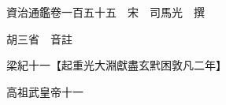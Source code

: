 










 


 
 


 

  
  
  
  
  





  
  
  
  
  
 
  

  

  
  
  



  

 
 

  
   




  

  
  


  　　資治通鑑卷一百五十五　宋　司馬光　撰

　　胡三省　音註

　　梁紀十一【起重光大淵獻盡玄黓困敦凡二年】

　　高祖武皇帝十一

